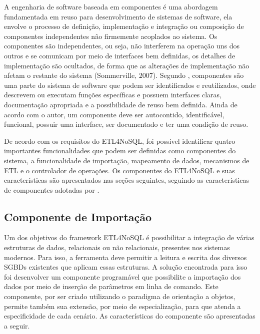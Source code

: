 A engenharia de software baseada em componentes é uma abordagem fundamentada em reuso para desenvolvimento de sistemas de software, ela envolve o processo de definição, implementação e integração ou composição de componentes independentes não firmemente acoplados ao sistema. Os componentes são independentes, ou seja, não interferem na operação uns dos outros e se comunicam por meio de interfaces bem definidas, os detalhes de implementação são ocultados, de forma que as alterações de implementação não afetam o restante do sistema (Sommerville, 2007). Segundo \cite{sametinger:1997}, componentes são uma parte do sistema de software que podem ser identificados e reutilizados, onde descrevem ou executam funções específicas e possuem interfaces claras, documentação apropriada e a possibilidade de reuso bem definida. Ainda de acordo com o autor, um componente deve ser autocontido, identificável, funcional, possuir uma interface, ser documentado e ter uma condição de reuso. 

De acordo com os requisitos do ETL4NoSQL, foi possível identificar quatro importantes funcionalidades que podem ser definidas como componentes do sistema, a funcionalidade de importação, mapeamento de dados, mecanismos de ETL e o controlador de operações. Os componentes do ETL4NoSQL e suas características são apresentados nas seções seguintes, seguindo as características de componentes adotadas por \cite{heineman:2001}.


\subsection{Componente de Importação}

Um dos objetivos do framework ETL4NoSQL é possibilitar a integração de várias estruturas de dados, relacionais ou não relacionais, presentes nos sistemas modernos. Para isso, a ferramenta deve permitir a leitura e escrita dos diversos SGBDs existentes que aplicam essas estruturas. A solução encontrada para isso foi desenvolver um componente programável que possibilite a importação dos dados por meio de inserção de parâmetros em linha de comando. Este componente, por ser criado utilizando o paradigma de orientação a objetos, permite também sua extensão, por meio de especialização, para que atenda a especificidade de cada cenário. As características do componente são apresentadas a seguir.

